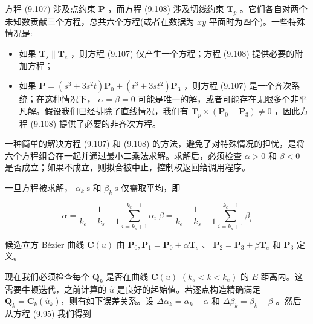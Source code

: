 \documentclass[../main.tex]{subfiles}
\begin{document}
方程 (9.107) 涉及点约束 \(\mathbf{P}\) ，而方程 (9.108) 涉及切线约束 \({\mathbf{T}}_{p}\) 。它们各自对两个未知数贡献三个方程，总共六个方程(或者在数据为 \({xy}\) 平面时为四个)。一些特殊情况是:

\begin{itemize}
\item 如果 \({\mathbf{T}}_{s}\parallel {\mathbf{T}}_{e}\) ，则方程 (9.107) 仅产生一个方程；方程 (9.108) 提供必要的附加方程；
\end{itemize}



\begin{itemize}
\item 如果 \(\mathbf{P} = \left( {{s}^{3} + 3{s}^{2}t}\right) {\mathbf{P}}_{0} + \left( {{t}^{3} + {3s}{t}^{2}}\right) {\mathbf{P}}_{3}\) ，则方程 (9.107) 是一个齐次系统；在这种情况下， \(\alpha  = \beta  = 0\) 可能是唯一的解，或者可能存在无限多个非平凡解。假设我们已经排除了直线情况，我们有 \({\mathbf{T}}_{p} \times  \left( {{\mathbf{P}}_{0} - {\mathbf{P}}_{3}}\right)  \neq  0\) ，因此方程 (9.108) 提供了必要的非齐次方程。
\end{itemize}

一种简单的解决方程 (9.107) 和 (9.108) 的方法，避免了对特殊情况的担忧，是将六个方程组合在一起并通过最小二乘法求解。求解后，必须检查 \(\alpha  > 0\) 和 \(\beta  < 0\) 是否成立；如果不成立，则拟合被中止，控制权返回给调用程序。

一旦方程被求解， \({\alpha }_{k}\mathrm{\;s}\) 和 \({\beta }_{k}\mathrm{\;s}\) 仅需取平均，即

\[
\alpha  = \frac{1}{{k}_{e} - {k}_{s} - 1}\mathop{\sum }\limits_{{i = {k}_{s} + 1}}^{{{k}_{e} - 1}}{\alpha }_{i}\;\beta  = \frac{1}{{k}_{e} - {k}_{s} - 1}\mathop{\sum }\limits_{{i = {k}_{s} + 1}}^{{{k}_{e} - 1}}{\beta }_{i} \tag{9.109}
\]

候选立方 Bézier 曲线 \(\mathbf{C}\left( u\right)\) 由 \({\mathbf{P}}_{0},{\mathbf{P}}_{1} = {\mathbf{P}}_{0} + \alpha {\mathbf{T}}_{s}\) 、 \({\mathbf{P}}_{2} = {\mathbf{P}}_{3} + \beta {\mathbf{T}}_{e}\) 和 \({\mathbf{P}}_{3}\) 定义。

现在我们必须检查每个 \({\mathbf{Q}}_{k}\) 是否在曲线 \(\mathbf{C}\left( u\right)\)  \(\left( {{k}_{s} < k < {k}_{e}}\right)\) 的 \(E\) 距离内。这需要牛顿迭代，之前计算的 \(\widehat{u}\) 是良好的起始值。若逐点构造精确满足\({\mathbf{Q}}_k={\mathbf C}_k(\widehat u_k)\)，则有如下误差关系。设 \(\Delta {\alpha }_{k} = {\alpha }_{k} - \alpha\) 和 \(\Delta {\beta }_{k} = {\beta }_{k} - \beta\) 。然后从方程 (9.95) 我们得到
\end{document}
